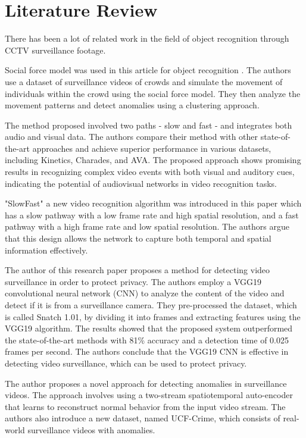 \documentclass[conference]{IEEEtran}
\begin{document}
\section{Literature Review}
There has been a lot of related work in the field of object recognition through CCTV surveillance footage. 

Social force model was used in this article for object recognition \cite{b1}. The authors use a dataset of surveillance videos of crowds and simulate the movement of individuals within the crowd using the social force model. They then analyze the movement patterns and detect anomalies using a clustering approach.

The method proposed involved two paths - slow and fast - and integrates both audio and visual data. \cite{b2} The authors compare their method with other state-of-the-art approaches and achieve superior performance in various datasets, including Kinetics, Charades, and AVA. The proposed approach shows promising results in recognizing complex video events with both visual and auditory cues, indicating the potential of audiovisual networks in video recognition tasks. 

"SlowFast" a new video recognition algorithm was introduced in this paper which has a slow pathway with a low frame rate and high spatial resolution, and a fast pathway with a high frame rate and low spatial resolution. The authors argue that this design allows the network to capture both temporal and spatial information effectively. \cite{b3}

The author of this research paper proposes a method for detecting video surveillance in order to protect privacy. The authors employ a VGG19 convolutional neural network (CNN) to analyze the content of the video and detect if it is from a surveillance camera. They pre-processed the dataset, which is called Snatch 1.01, by dividing it into frames and extracting features using the VGG19 algorithm. The results showed that the proposed system outperformed the state-of-the-art methods with 81\% accuracy and a detection time of 0.025 frames per second. The authors conclude that the VGG19 CNN is effective in detecting video surveillance, which can be used to protect privacy. \cite{b4}

The author proposes a novel approach for detecting anomalies in surveillance videos. The approach involves using a two-stream spatiotemporal auto-encoder that learns to reconstruct normal behavior from the input video stream. The authors also introduce a new dataset, named UCF-Crime, which consists of real-world surveillance videos with anomalies. \cite{b5}
\end{document}
